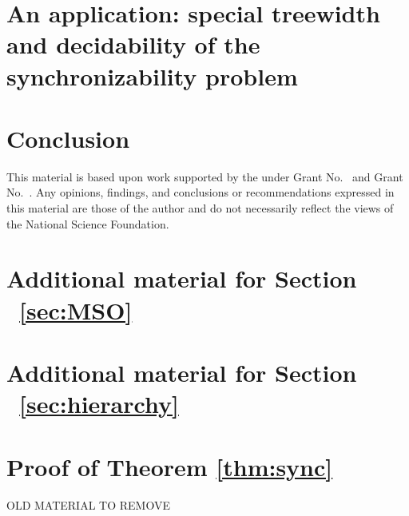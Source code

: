 \documentclass[acmsmall,review,anonymous,screen]{acmart}\settopmatter{printfolios=true,printccs=false,printacmref=true}
\begin{document}


\section{An application: special treewidth and decidability of the synchronizability problem} \label{sec:checking}



\section{Conclusion}\label{sec:conc}

\begin{acks}                            %
  This material is based upon work supported by the
   under Grant
  No.~ and Grant
  No.~.  Any opinions, findings, and
  conclusions or recommendations expressed in this material are those
  of the author and do not necessarily reflect the views of the
  National Science Foundation.
\end{acks}






\newpage

\appendix

\section{Additional material for Section ~\ref{sec:MSO}}
\label{apx:MSO}


\section{Additional material for Section ~\ref{sec:hierarchy}}
\label{apx:hierarchy}


\section{Proof of Theorem \ref{thm:sync}}
\label{apx:sync}




\newpage
OLD MATERIAL TO REMOVE


% 

\end{document}
